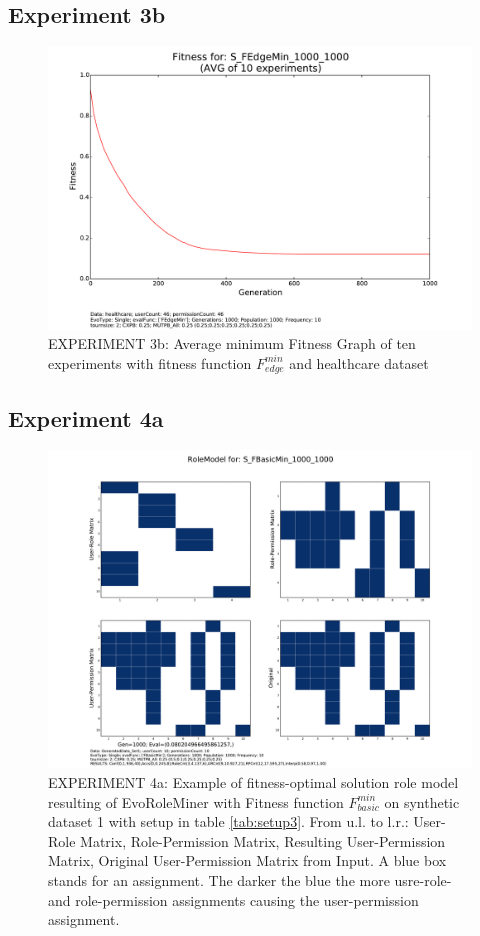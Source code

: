    
\subsection{Experiment 3b}
    \begin{figure}[H]
        \centering
        \includegraphics[scale=0.4, trim=0cm 2cm 0cm 0cm, clip=true]{./Figures/exp3bFitness}
        \caption{EXPERIMENT 3b: Average minimum Fitness Graph of ten experiments with fitness function $F_{edge}^{min}$ and healthcare dataset}
    \label{fig:exp3bfitness}
    \end{figure}

    
\subsection{Experiment 4a}
    \begin{figure}[H]
    	\centering
    	\includegraphics[scale=0.37, trim=4cm 2cm 4cm 2cm, clip=true]{./Figures/exp4aBasic_RM}
    	\caption{EXPERIMENT 4a: Example of fitness-optimal solution role model resulting of EvoRoleMiner with Fitness function $F_{basic}^{min}$ on synthetic dataset 1 with setup in table \ref{tab:setup3}. From u.l. to l.r.: User-Role Matrix, Role-Permission Matrix, Resulting User-Permission Matrix, Original User-Permission Matrix from Input. A blue box stands for an assignment. The darker the blue the more usre-role- and role-permission assignments causing the user-permission assignment.}
    	\label{fig:exp4aBasic_RM}
    \end{figure}


